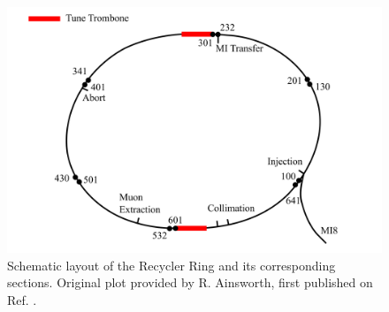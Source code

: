 \cite{pipII1} \cite{rr2} \cite{fermi_rookie}

\begin{figure}[H]
   \centering
   \includegraphics[width=\columnwidth]{chapter3/RRschematic.png}
   \caption{Schematic layout of the Recycler Ring and its corresponding sections. Original plot provided by R. Ainsworth, first published on Ref. \cite{rr1}.}
   \label{fig:rrschematic}
\end{figure}


